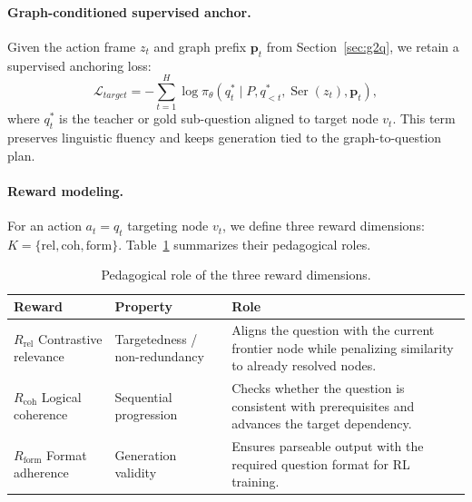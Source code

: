 \documentclass[sigconf, anonymous, review, screen]{acmart}
\begin{document}
\paragraph{Graph-conditioned supervised anchor.}
Given the action frame $z_t$ and graph prefix $\mathbf{p}_t$ from Section~\ref{sec:g2q}, we retain a supervised anchoring loss:
\begin{equation}
\mathcal{L}_{target}
=
-\sum_{t=1}^{H}
\log \pi_\theta
\left(
q_t^*
\mid
P,q_{<t}^*,\operatorname{Ser}(z_t),\mathbf{p}_t
\right),
\label{eq:lqgt}
\end{equation}
where $q_t^*$ is the teacher or gold sub-question aligned to target node $v_t$. This term preserves linguistic fluency and keeps generation tied to the graph-to-question plan.

\paragraph{Reward modeling.}
For an action $a_t=q_t$ targeting node $v_t$, we define three reward dimensions:
$K=\{\mathrm{rel},\mathrm{coh},\mathrm{form}\}$. Table~\ref{tab:reward_role} summarizes their pedagogical roles.

\begin{table}[t]
\centering
\scriptsize
\caption{Pedagogical role of the three reward dimensions.}
\label{tab:reward_role}
\setlength{\tabcolsep}{4pt}
\begin{tabular}{p{}p{}p{}}
\toprule
\textbf{Reward} & \textbf{Property} & \textbf{Role} \\
\midrule
$R_{\mathrm{rel}}$ Contrastive relevance
& Targetedness / non-redundancy
& Aligns the question with the current frontier node while penalizing similarity to already resolved nodes. \\
$R_{\mathrm{coh}}$ Logical coherence
& Sequential progression
& Checks whether the question is consistent with prerequisites and advances the target dependency. \\
$R_{\mathrm{form}}$ Format adherence
& Generation validity
& Ensures parseable output with the required question format for RL training. \\
\bottomrule
\end{tabular}

\end{table}
\end{document}
